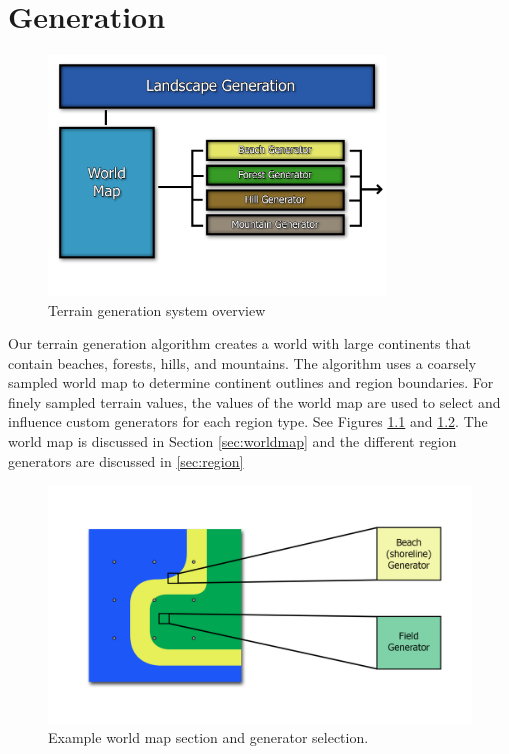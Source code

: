 
\chapter{Generation}

\begin{figure}
  \centering
    \includegraphics[width=0.8\textwidth]{figures/GeneratorSystem}
  \caption{Terrain generation system overview}
  \label{fig:gen_overview}
\end{figure}

Our terrain generation algorithm creates a world with large continents that contain beaches, forests, hills, and mountains.
The algorithm uses a coarsely sampled world map to determine continent outlines and region boundaries.
For finely sampled terrain values, the values of the world map are used to select and influence custom generators for each region type.
See Figures \ref{fig:gen_overview} and \ref{fig:worldmap}.
The world map is discussed in Section \ref{sec:worldmap} and the different region generators are discussed in \ref{sec:region}

\begin{figure}
	\centering
		\includegraphics[width=1.0\textwidth]{figures/worldmap.png}
	\caption{Example world map section and generator selection.}
	\label{fig:worldmap}
\end{figure}

